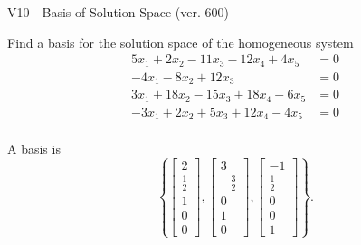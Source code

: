 \begin{exercise}
  \begin{exerciseTitle}V10 - Basis of Solution Space (ver. 600)\end{exerciseTitle}
  \begin{exerciseStatement}
    Find a basis for the solution space of the homogeneous system 
\begin{align*}
 5 x_ 1 + 2 x_ 2 -11 x_ 3 -12 x_ 4 + 4 x_ 5 &= 0  \\ 
  -4 x_ 1 -8 x_ 2 + 12 x_ 3 &= 0  \\ 
  3 x_ 1 + 18 x_ 2 -15 x_ 3 + 18 x_ 4 -6 x_ 5 &= 0  \\ 
  -3 x_ 1 + 2 x_ 2 + 5 x_ 3 + 12 x_ 4 -4 x_ 5 &= 0  \\ 
 \end{align*}


 
  \end{exerciseStatement}

  \begin{exerciseAnswer}
   A basis is   
\[\left\{\left[\begin{array}{c}
2 \\
\frac{1}{2} \\
1 \\
0 \\
0
\end{array}\right] , \left[\begin{array}{c}
3 \\
-\frac{3}{2} \\
0 \\
1 \\
0
\end{array}\right] , \left[\begin{array}{c}
-1 \\
\frac{1}{2} \\
0 \\
0 \\
1
\end{array}\right]\right\}.\]

  


  \end{exerciseAnswer}
\end{exercise}